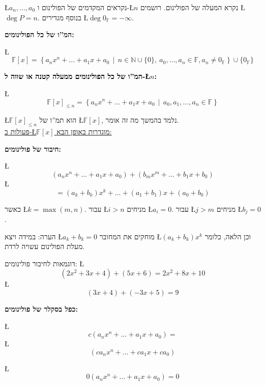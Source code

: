 \documentclass[english,hebrew]{article}
\begin{document}
\L{$a_{n},\dots,a_{0}$} נקראים המקדמים של הפולינום ו-\L{$n$} נקרא
המעלה של הפולינום. רושמים \L{$\deg P=n$}. בנוסף מגדירים \L{$\deg0_{\mathbb{F}}=-\infty$}.

\textbf{המ\textquotedblright ו של כל הפולינומים:}

\L{%
\[
\mathbb{F}[x]=\left\{ a_{n}x^{n}+...+a_{1}x+a_{0}\,\middle|\,n\in\mathbb{N}\cup\{0\},\ a_{0},\dots,a_{n}\in\mathbb{F},a_{n}\ne0_{\mathbb{F}}\right\} \cup\{0_{\mathbb{F}}\}
\]
}%

\textbf{\textcolor{black}{המ\textquotedblright ו של כל הפולינומים
ממעלה קטנה או שווה ל-\L{$n$}:}}

\L{%
\[
\mathbb{F}[x]_{\le n}=\left\{ a_{n}x^{n}+\dots+a_{1}x+a_{0}\,\middle|\,a_{0},a_{1},\dots,a_{n}\in\mathbb{F}\right\} 
\]
}%

\L{$\mathbb{F}[x]_{\le n}$} הוא תמ\textquotedblright ו של \L{$\mathbb{F}[x]$},
נלמד בהמשך מה זה אומר. \\

\uline{פעולות ב-\L{\mbox{$\mathbb{F}[x]$}} מוגדרות באופן הבא:}

\textbf{חיבור של פולינומים:}

\L{%
\[
(a_{n}x^{n}+\dots+a_{1}x+a_{0})+(b_{m}x^{m}+\dots+b_{1}x+b_{0})
\]
}%
\L{%
\[
=(a_{k}+b_{k})x^{k}+\dots+(a_{1}+b_{1})x+(a_{0}+b_{0})
\]
}%

כאשר \L{$k=\max(m,n)$}. עבור \L{$i>n$} מניחים \L{$a_{i}=0$}. עבור
\L{$j>m$} מניחים \L{$b_{j}=0$}.

הערה: במידה ויצא \L{$a_{k}+b_{k}=0$} מוחקים את המחובר \L{$(a_{k}+b_{k})x^{k}$}
וכן הלאה, כלומר מעלת הפולינום עשויה לרדת.

דוגמאות לחיבור פולינומים: \L{%
\[
(2x^{2}+3x+4)+(5x+6)=2x^{2}+8x+10
\]
}%
\L{%
\[
(3x+4)+(-3x+5)=9
\]
}%

\textbf{כפל בסקלר של פולינומים:}

\L{%
\[
c(a_{n}x^{n}+\dots+a_{1}x+a_{0})=
\]
}%
\L{%
\[
(ca_{n}x^{n}+\dots+ca_{1}x+ca_{0})
\]
}%

\L{%
\[
0(a_{n}x^{n}+\dots+a_{1}x+a_{0})=0
\]
}%
\end{document}
